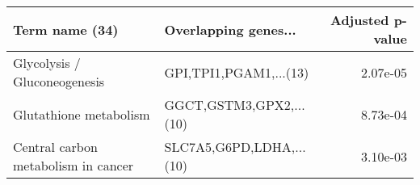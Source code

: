 \begin{tabular}{llr}
\toprule
                     Term name (34) &     Overlapping genes... &  Adjusted p-value \\
\midrule
       Glycolysis / Gluconeogenesis &   GPI,TPI1,PGAM1,...(13) &          2.07e-05 \\
             Glutathione metabolism &  GGCT,GSTM3,GPX2,...(10) &          8.73e-04 \\
Central carbon metabolism in cancer & SLC7A5,G6PD,LDHA,...(10) &          3.10e-03 \\
\bottomrule
\end{tabular}
